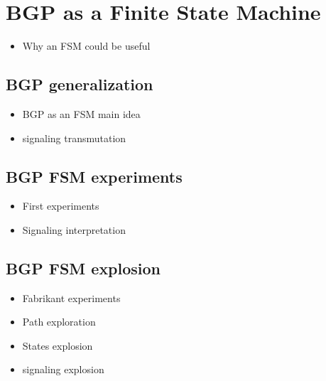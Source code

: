 \chapter{BGP as a Finite State Machine}
\label{cha:bgp_fsm}

\begin{itemize}
    \item Why an FSM could be useful
\end{itemize}

\section{BGP generalization}
\label{sec:bgp_generalization}

\begin{itemize}
    \item BGP as an FSM main idea
    \item signaling transmutation
\end{itemize}

\section{BGP FSM experiments}
\label{sec:bgp_fsm_experiments}

\begin{itemize}
    \item First experiments
    \item Signaling interpretation
\end{itemize}

\section{BGP FSM explosion}
\label{sec:bgp_fsm_explosion}

\begin{itemize}
    \item Fabrikant experiments
    \item Path exploration
    \item States explosion
    \item signaling explosion
\end{itemize}